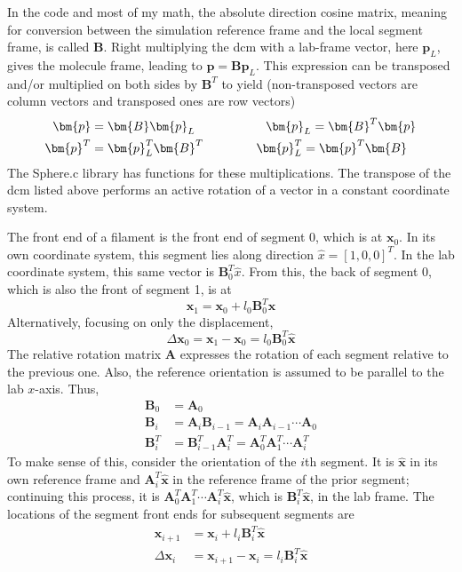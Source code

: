 \documentclass {scrbook}
\begin{document}
In the code and most of my math, the absolute direction cosine matrix, meaning for conversion between the simulation reference frame and the local segment frame, is called $\bm{B}$. Right multiplying the dcm with a lab-frame vector, here $\bm{p}_L$, gives the molecule frame, leading to $\bm{p} = \bm{B} \bm{p}_L$. This expression can be transposed and/or multiplied on both sides by $\bm{B}^T$ to yield (non-transposed vectors are column vectors and transposed ones are row vectors)
\begin{align}
\bm{p} &= \bm{B} \bm{p}_L \hspace{2cm} \bm{p}_L = \bm{B}^T \bm{p} \\
\bm{p}^T &= \bm{p}_L^T \bm{B}^T \hspace{1.5cm} \bm{p}_L^T = \bm{p}^T \bm{B}
\end{align}
The Sphere.c library has functions for these multiplications. The transpose of the dcm listed above performs an active rotation of a vector in a constant coordinate system.

The front end of a filament is the front end of segment 0, which is at $\bm{x}_0$. In its own coordinate system, this segment lies along direction $\hat{x} = [1,0,0]^T$. In the lab coordinate system, this same vector is $\bm{B}_0^T \hat{x}$. From this, the back of segment 0, which is also the front of segment 1, is at
$$\bm{x}_1=\bm{x}_0 + l_0 \bm{B}^T_0 \bm{\hat{x}}$$
Alternatively, focusing on only the displacement,
$$\Delta \bm{x}_0 = \bm{x}_1 - \bm{x}_0 = l_0 \bm{B}^T_0 \bm{\hat{x}}$$
The relative rotation matrix $\bm{A}$ expresses the rotation of each segment relative to the previous one. Also, the reference orientation is assumed to be parallel to the lab $x$-axis. Thus,
\begin{align}
\bm{B}_0 &= \bm{A}_0 \nonumber \\
\bm{B}_i &= \bm{A}_i \bm{B}_{i-1} = \bm{A}_i \bm{A}_{i-1} \cdots \bm{A}_0 \nonumber \\
\bm{B}^T_i &= \bm{B}^T_{i-1} \bm{A}^T_i = \bm{A}^T_0 \bm{A}^T_1 \cdots \bm{A}^T_i
\label{eq:AbsoluteDCM}
\end{align}
To make sense of this, consider the orientation of the $i$th segment. It is $\hat{\bm{x}}$ in its own reference frame and $\bm{A}_i^T\hat{\bm{x}}$ in the reference frame of the prior segment; continuing this process, it is $\bm{A}^T_0 \bm{A}^T_1 \cdots \bm{A}^T_i\hat{\bm{x}}$, which is $\bm{B}^T_i\hat{\bm{x}}$, in the lab frame. The locations of the segment front ends for subsequent segments are
\begin{align}
\bm{x}_{i+1} &= \bm{x}_i + l_i \bm{B}^T_i \bm{\hat{x}} \nonumber \\
\Delta \bm{x}_{i} &= \bm{x}_{i+1} - \bm{x}_i = l_i \bm{B}^T_i \bm{\hat{x}}
\label{eq:NodePositions}
\end{align}
\end{document}
